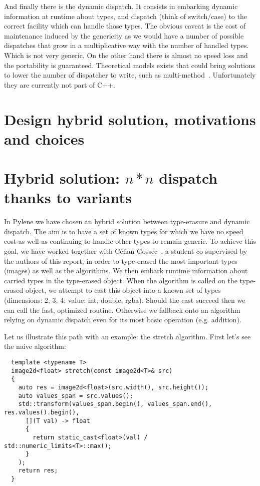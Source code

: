 And finally there is the dynamic dispatch. It consists in embarking dynamic information at runtime about types, and
dispatch (think of switch/case) to the correct facility which can handle those types. The obvious caveat is the cost of
maintenance induced by the genericity as we would have a number of possible dispatches that grow in a multiplicative way
with the number of handled types. Which is not very generic. On the other hand there is almost no speed loss and the
portability is guaranteed. Theoretical models exists that could bring solutions to lower the number of dispatcher to
write, such as multi-method~\cite{pirkelbauer.2010.multimethods}. Unfortunately they are currently not part of C++.


\section{Design hybrid solution, motivations and choices}


\section{Hybrid solution: $n*n$ dispatch thanks to variants}



In Pylene we have chosen an hybrid solution between type-erasure and dynamic dispatch. The aim is to have a set of known
types for which we have no speed cost as well as continuing to handle other types to remain generic. To achieve this
goal, we have worked together with Célian Gossec~\cite{gossec.2019.pybind}, a student co-supervised by the authors of
this report, in order to type-erased the most important types (images) as well as the algorithms. We then embark runtime
information about carried types in the type-erased object. When the algorithm is called on the type-erased object, we
attempt to cast this object into a known set of types (dimensions: 2, 3, 4; value: int, double, rgba). Should the cast
succeed then we can call the fast, optimized routine. Otherwise we fallback onto an algorithm relying on dynamic
dispatch even for its most basic operation (e.g. addition).

Let us illustrate this path with an example: the stretch algorithm. First let's see the naive algorithm:
\begin{verbatim}
  template <typename T>
  image2d<float> stretch(const image2d<T>& src)
  {
    auto res = image2d<float>(src.width(), src.height());
    auto values_span = src.values();
    std::transform(values_span.begin(), values_span.end(), res.values().begin(),
      [](T val) -> float
      {
        return static_cast<float>(val) / std::numeric_limits<T>::max();
      }
    );
    return res;
  }
\end{verbatim}

